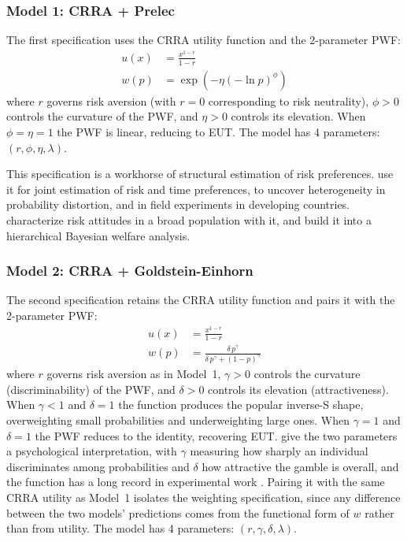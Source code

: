\documentclass[12pt,a4paper]{article}
\theoremstyle{definition}
\theoremstyle{remark}
\begin{document}
\subsubsection*{Model 1: CRRA + Prelec}

The first specification uses the CRRA utility function and the 2-parameter
\textcite{Prelec1998} PWF:
\begin{align}
  \label{eq:crra}
  u(x) &= \frac{x^{1-r}}{1 - r} \\
  \label{eq:prelec}
  w(p) &= \exp\!\left(-\eta \left(-\ln p\right)^\phi\right)
\end{align}
where $r$ governs risk aversion (with $r = 0$ corresponding to risk
neutrality), $\phi > 0$ controls the curvature of the PWF, and $\eta > 0$
controls its elevation. When $\phi = \eta = 1$ the PWF is linear, reducing to
EUT\@. The model has 4 parameters: $(r, \phi, \eta, \lambda)$.

This specification is a workhorse of structural estimation of risk
preferences. \textcite{Andersen2008} use it for joint estimation of risk and
time preferences, \textcite{BruhinFehrDudaEpper2010} to uncover heterogeneity
in probability distortion, and \textcite{Tanaka2010} in field experiments in
developing countries. \textcite{vonGaudecker2011} characterize risk attitudes
in a broad population with it, and \textcite{Gao2022} build it into a
hierarchical Bayesian welfare analysis.

\subsubsection*{Model 2: CRRA + Goldstein-Einhorn}

The second specification retains the CRRA utility function and pairs it with
the 2-parameter \textcite{GoldsteinEinhorn1987} PWF:
\begin{align}
  \label{eq:crra_ge}
  u(x) &= \frac{x^{1-r}}{1 - r} \\
  \label{eq:ge}
  w(p) &= \frac{\delta\, p^\gamma}
               {\delta\, p^\gamma + (1-p)^\gamma}
\end{align}
where $r$ governs risk aversion as in Model~1, $\gamma > 0$ controls the
curvature (discriminability) of the PWF, and $\delta > 0$ controls its
elevation (attractiveness). When $\gamma < 1$ and $\delta = 1$ the function
produces the popular inverse-S shape, overweighting small
probabilities and underweighting large ones. When $\gamma = 1$ and $\delta = 1$
the PWF reduces to the identity, recovering EUT\@.
\textcite{GonzalezWu1999} give the two parameters a psychological
interpretation, with $\gamma$ measuring how sharply an individual
discriminates among probabilities and $\delta$ how attractive the gamble is
overall, and the function has a long record in experimental work
\parencite{Lattimore1992,Stott2006}. Pairing it with the same CRRA utility
as Model~1 isolates the weighting specification, since any difference
between the two models' predictions comes from the functional form of $w$
rather than from utility. The model has 4
parameters: $(r, \gamma, \delta, \lambda)$.
\end{document}
